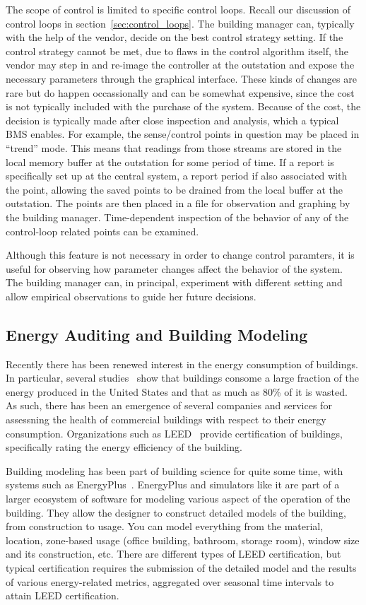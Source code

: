 The scope of control is limited to specific control loops.  Recall our discussion of control loops in section~\ref{sec:control_loops}.
The building manager can, typically with the help of the vendor, decide on the best control strategy setting.  If the control
strategy cannot be met, due to flaws in the control algorithm itself, the vendor may step in and re-image the controller
at the outstation and expose the necessary parameters through the graphical interface.  These kinds of changes are rare
but do happen occassionally and can be somewhat expensive, since the cost is not typically included with the purchase
of the system.  Because of the cost, the decision is typically made after close inspection and analysis, which a typical BMS
enables.  For example, the sense/control points in question may be placed in ``trend'' mode.  This means that readings
from those streams are stored in the local memory buffer at the outstation for some period of time.  If a report is specifically
set up at the central system, a report period if also associated with the point, allowing the saved points to be drained
from the local buffer at the outstation.  The points are then placed in a file for observation and graphing by the 
building manager.  Time-dependent inspection of the behavior of any of the control-loop related points can be examined.

Although this feature is not necessary in order to change control paramters, it is useful for observing how parameter changes
affect the behavior of the system.  The building manager can, in principal, experiment with different setting and allow
empirical observations to guide her future decisions.


\subsection{Energy Auditing and Building Modeling}
Recently there has been renewed interest in the energy consumption of buildings.  In particular, several studies~\cite{BuildingEnergyData,
MITBuildingScience} show that buildings consome a large fraction of the energy produced in the United States and that as much
as 80\% of it is wasted.  As such, there has been an emergence of several companies and services for assessning the health of
commercial buildings with respect to their energy consumption.  Organizations such as LEED~\cite{Leed} provide certification of 
buildings, specifically rating the energy efficiency of the building.

Building modeling has been part of building science for quite some time, with systems such as EnergyPlus~\cite{EnergyPlus}.
EnergyPlus and simulators like it are part of a larger ecosystem of software for modeling various aspect of the operation
of the building.  They allow the designer to construct detailed models of the building, from construction to usage.  You can
model everything from the material, location, zone-based usage (office building, bathroom, storage room), window size and its
construction, etc.  There are different types of LEED certification, but typical certification requires the submission of the detailed
model and the results of various energy-related metrics, aggregated over seasonal time intervals to attain LEED certification.

